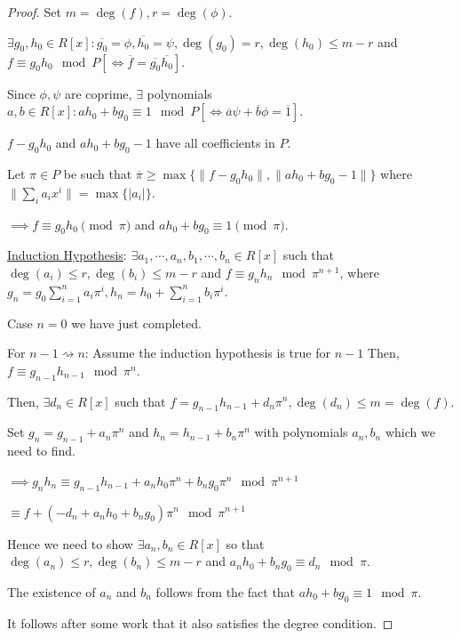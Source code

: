 \documentclass[openany]{amsbook}
\numberwithin{section}{chapter}
\theoremstyle{definition}
\begin{document}
\begin{proof}
    Set \(m=\deg(f),r=\deg(\phi)\).

    \(\exists g_0, h_0\in R[x]: \overline{g_0}= \phi, \overline{h_0} = \psi , \deg(g_0)=r, \deg(h_0) \leq m-r\) and \(f \equiv g_0 h_0 \mod P [\iff \overline{f} = \overline{g_0} \overline{h_0}]\).
    
    Since \(\phi , \psi\) are coprime, \(\exists\) polynomials \(a,b\in R[x]: ah_0 + bg_0 \equiv 1 \mod P [\iff \overline{a} \psi + \overline{b} \phi = \overline{1}].\)
    
    \(f - g_0 h_0\) and \(a h_0 + b g_0 - 1\) have all coefficients in \(P\).

    Let \(\pi \in P\) be such that \(\overline{\pi } \geq \max \{ \lVert f - g_0 h_0 \rVert, \lVert a h_0 + b g_0 - 1 \rVert\}\) where \(\lVert \sum_{i} a_i x^i \rVert = \max \{ \vert a_i \vert \}\).

    \(\implies f \equiv g_0 h_0 \pmod \pi\) and \(a h_0 + b g_0 \equiv 1\pmod \pi\).

    \underline{Induction Hypothesis}: \(\exists a_1, \cdots , a_n, b_1, \cdots , b_n \in R[x]\) such that \(\deg(a_i)\leq r, \deg(b_i) \leq m-r\) and \(f \equiv g_n h_n \mod \pi^{n+1}\), where \(g_n = g_0 \sum_{i=1}^n a_i \pi^i, h_n = h_0 + \sum_{i=1}^n b_i \pi^i\).

    Case \(n=0\) we have just completed.

    For \(n-1 \rightsquigarrow n\): Assume the induction hypothesis is true for \(n-1\) Then, \(f\equiv g_{n-1} h_{n-1} \mod \pi^n\).
    
    Then, \(\exists d_n \in R[x]\) such that \(f=g_{n-1} h_{n-1} + d_n \pi^n, \deg(d_n) \leq m = \deg(f)\).

    Set \(g_n = g_{n-1} + a_n \pi^n\) and \(h_n = h_{n-1} + b_n \pi^n\) with polynomials \(a_n, b_n\) which we need to find.

    \(\implies g_n h_n \equiv g_{n-1} h_{n-1} + a_n h_0 \pi^n + b_n g_0 \pi^n \mod \pi^{n+1}\)
    
    \(\equiv f + \left( - d_n + a_n h_0 + b_n g_0 \right) \pi^n \mod \pi^{n+1}\)
    
    Hence we need to show \(\exists a_n, b_n\in R[x]\) so that \(\deg(a_n) \leq r, \deg(b_n)\leq m-r\) and \(a_n h_0 + b_n g_0 \equiv d_n \mod \pi\).

    The existence of \(a_n\) and \(b_n\) follows from the fact that \(ah_0 + bg_0 \equiv 1\mod\pi\).

    It follows after some work that it also satisfies the degree condition.
\end{proof}
\end{document}
